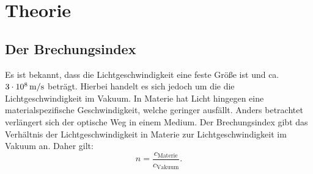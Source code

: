 
\section{Theorie}
\label{sec:Theorie}
\subsection{Der Brechungsindex}
Es ist bekannt, dass die Lichtgeschwindigkeit eine feste Größe ist und ca. $\SI{3 E8}{\meter\per\second}$ beträgt. Hierbei handelt es sich jedoch um die die Lichtgeschwindigkeit im Vakuum.  In Materie hat Licht hingegen eine materialspezifische Geschwindigkeit, welche geringer ausfällt. Anders betrachtet verlängert sich der optische Weg in einem Medium. Der Brechungsindex gibt das Verhältnis der Lichtgeschwindigkeit in Materie zur Lichtgeschwindigkeit im Vakuum an. Daher gilt:
\begin{equation}
    n = \frac{c_\text{Materie}}{c_\text{Vakuum}} \label{eq:n} \text{.}
\end{equation}  

